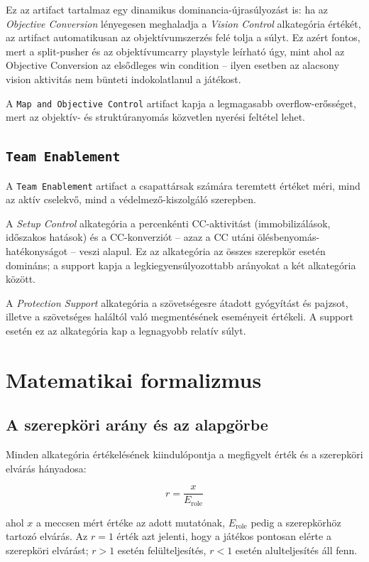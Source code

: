 ﻿\documentclass[a4paper,12pt]{report}
\begin{document}
Ez az artifact tartalmaz egy dinamikus dominancia-újrasúlyozást is: ha az \emph{Objective Conversion} lényegesen meghaladja a \emph{Vision Control} alkategória értékét, az artifact automatikusan az objektívumszerzés felé tolja a súlyt. Ez azért fontos, mert a split-pusher és az objektívumcarry playstyle leírható úgy, mint ahol az Objective Conversion az elsődleges win condition -- ilyen esetben az alacsony vision aktivitás nem bünteti indokolatlanul a játékost.

A \texttt{Map and Objective Control} artifact kapja a legmagasabb overflow-erősséget, mert az objektív- és struktúranyomás közvetlen nyerési feltétel lehet.

\subsection{\texttt{Team Enablement}}

A \texttt{Team Enablement} artifact a csapattársak számára teremtett értéket méri, mind az aktív cselekvő, mind a védelmező-kiszolgáló szerepben.

A \emph{Setup Control} alkategória a percenkénti CC-aktivitást (immobilizálások, időszakos hatások) és a CC-konverziót -- azaz a CC utáni ölésbenyomás-hatékonyságot -- veszi alapul. Ez az alkategória az összes szerepkör esetén domináns; a support kapja a legkiegyensúlyozottabb arányokat a két alkategória között.

A \emph{Protection Support} alkategória a szövetségesre átadott gyógyítást és pajzsot, illetve a szövetséges haláltól való megmentésének eseményeit értékeli. A support esetén ez az alkategória kap a legnagyobb relatív súlyt.

\section{Matematikai formalizmus}

\subsection{A szerepköri arány és az alapgörbe}

Minden alkategória értékelésének kiindulópontja a megfigyelt érték és a szerepköri elvárás hányadosa:

\begin{equation}
r = \frac{x}{E_{\text{role}}}
\end{equation}

ahol $x$ a meccsen mért értéke az adott mutatónak, $E_{\text{role}}$ pedig a szerepkörhöz tartozó elvárás. Az $r = 1$ érték azt jelenti, hogy a játékos pontosan elérte a szerepköri elvárást; $r > 1$ esetén felülteljesítés, $r < 1$ esetén alulteljesítés áll fenn.
\end{document}
